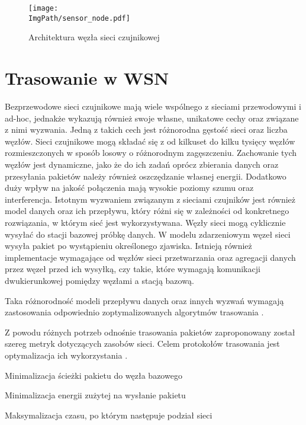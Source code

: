 \begin{figure}[H]
	\begin{center}
		\texttt{[image: \\ImgPath/sensor\_node.pdf]}
	\end{center}
	\caption{Architektura węzła sieci czujnikowej}
\end{figure}

\section{Trasowanie w WSN}
Bezprzewodowe sieci czujnikowe mają wiele wspólnego z sieciami przewodowymi i ad-hoc, jednakże wykazują również swoje własne, unikatowe cechy oraz związane z nimi wyzwania.
Jedną z takich cech jest różnorodna gęstość sieci oraz liczba węzłów. Sieci czujnikowe mogą składać się z od kilkuset do kilku tysięcy węzłów rozmieszczonych w sposób losowy o różnorodnym zagęszczeniu. Zachowanie tych węzłów jest dynamiczne, jako że do ich zadań oprócz zbierania danych oraz przesyłania pakietów należy również oszczędzanie własnej energii. Dodatkowo duży wpływ na jakość połączenia mają wysokie poziomy szumu oraz interferencja.
Istotnym wyzwaniem związanym z sieciami czujników jest również model danych oraz ich przepływu, który różni się w zależności od konkretnego rozwiązania, w którym sieć jest wykorzystywana. Węzły sieci mogą cyklicznie wysyłać do stacji bazowej próbkę danych. W modelu zdarzeniowym węzeł sieci wysyła pakiet po wystąpieniu określonego zjawiska. Istnieją również implementacje wymagające od węzłów sieci przetwarzania oraz agregacji danych przez węzeł przed ich wysyłką, czy takie, które wymagają komunikacji dwukierunkowej pomiędzy węzłami a stacją bazową.


Taka różnorodność modeli przepływu danych oraz innych wyzwań wymagają zastosowania odpowiednio zoptymalizowanych algorytmów trasowania \cite{Abdullah2014, Sohraby2006}.

Z powodu różnych potrzeb odnośnie trasowania pakietów zaproponowany został szereg metryk dotyczących zasobów sieci. Celem protokołów trasowania jest optymalizacja ich wykorzystania \cite{Dargie2010, Biradar2009}.

Minimalizacja ścieżki pakietu do węzła bazowego

Minimalizacja energii zużytej na wysłanie pakietu

Maksymalizacja czasu, po którym następuje podział sieci

